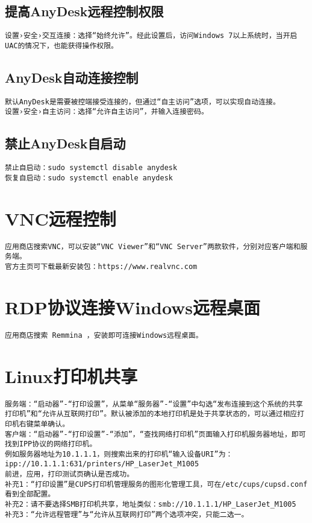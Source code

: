 \documentclass[a4paper,fontset=fandol,zihao=-4,linespread=1.2,oneside]{ctexbook}
\begin{document}
\subsection{提高AnyDesk远程控制权限}
\begin{lstlisting}
设置›安全›交互连接：选择“始终允许”。经此设置后，访问Windows 7以上系统时，当开启UAC的情况下，也能获得操作权限。
\end{lstlisting}

\subsection{AnyDesk自动连接控制}
\begin{lstlisting}
默认AnyDesk是需要被控端接受连接的，但通过“自主访问”选项，可以实现自动连接。
设置›安全›自主访问：选择“允许自主访问”，并输入连接密码。
\end{lstlisting}

\subsection{禁止AnyDesk自启动}
\begin{lstlisting}
禁止自启动：sudo systemctl disable anydesk
恢复自启动：sudo systemctl enable anydesk
\end{lstlisting}

\section{VNC远程控制}
\begin{lstlisting}
应用商店搜索VNC，可以安装“VNC Viewer”和“VNC Server”两款软件，分别对应客户端和服务端。
官方主页可下载最新安装包：https://www.realvnc.com
\end{lstlisting}

\section{RDP协议连接Windows远程桌面}
\begin{lstlisting}
应用商店搜索 Remmina ，安装即可连接Windows远程桌面。
\end{lstlisting}

\section{Linux打印机共享}
\begin{lstlisting}
服务端：“启动器”-“打印设置”，从菜单“服务器”-“设置”中勾选“发布连接到这个系统的共享打印机”和“允许从互联网打印”。默认被添加的本地打印机是处于共享状态的，可以通过相应打印机右键菜单确认。
客户端：“启动器”-“打印设置”-“添加”，“查找网络打印机”页面输入打印机服务器地址，即可找到IPP协议的网络打印机。
例如服务器地址为10.1.1.1，则搜索出来的打印机“输入设备URI”为：
ipp://10.1.1.1:631/printers/HP_LaserJet_M1005
前进，应用，打印测试页确认是否成功。
补充1：“打印设置”是CUPS打印机管理服务的图形化管理工具，可在/etc/cups/cupsd.conf看到全部配置。
补充2：请不要选择SMB打印机共享，地址类似：smb://10.1.1.1/HP_LaserJet_M1005
补充3：“允许远程管理”与“允许从互联网打印”两个选项冲突，只能二选一。
\end{lstlisting}
\end{document}
